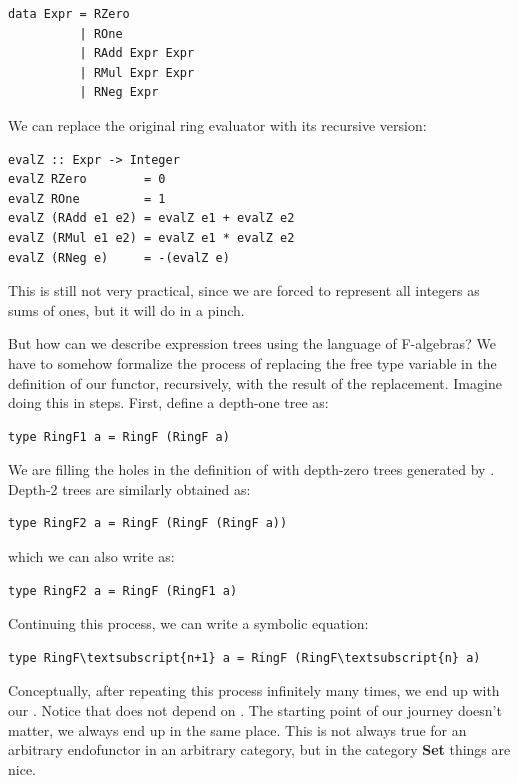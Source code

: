 \begin{Verbatim}[commandchars=\\\{\}]
data Expr = RZero 
          | ROne
          | RAdd Expr Expr
          | RMul Expr Expr
          | RNeg Expr
\end{Verbatim}
We can replace the original ring evaluator with its recursive version:

\begin{Verbatim}[commandchars=\\\{\}]
evalZ :: Expr -> Integer
evalZ RZero        = 0
evalZ ROne         = 1
evalZ (RAdd e1 e2) = evalZ e1 + evalZ e2
evalZ (RMul e1 e2) = evalZ e1 * evalZ e2
evalZ (RNeg e)     = -(evalZ e)
\end{Verbatim}
This is still not very practical, since we are forced to represent all
integers as sums of ones, but it will do in a pinch.

But how can we describe expression trees using the language of
F-algebras? We have to somehow formalize the process of replacing the
free type variable in the definition of our functor, recursively, with
the result of the replacement. Imagine doing this in steps. First,
define a depth-one tree as:

\begin{Verbatim}[commandchars=\\\{\}]
type RingF1 a = RingF (RingF a)
\end{Verbatim}
We are filling the holes in the definition of  with
depth-zero trees generated by . Depth-2 trees are
similarly obtained as:

\begin{Verbatim}[commandchars=\\\{\}]
type RingF2 a = RingF (RingF (RingF a))
\end{Verbatim}
which we can also write as:

\begin{Verbatim}[commandchars=\\\{\}]
type RingF2 a = RingF (RingF1 a)
\end{Verbatim}
Continuing this process, we can write a symbolic equation:

\begin{Verbatim}[commandchars=\\\{\}]
type RingF\textsubscript{n+1} a = RingF (RingF\textsubscript{n} a)
\end{Verbatim}
Conceptually, after repeating this process infinitely many times, we end
up with our . Notice that  does not depend on
. The starting point of our journey doesn't matter, we always
end up in the same place. This is not always true for an arbitrary
endofunctor in an arbitrary category, but in the category \textbf{Set}
things are nice.

